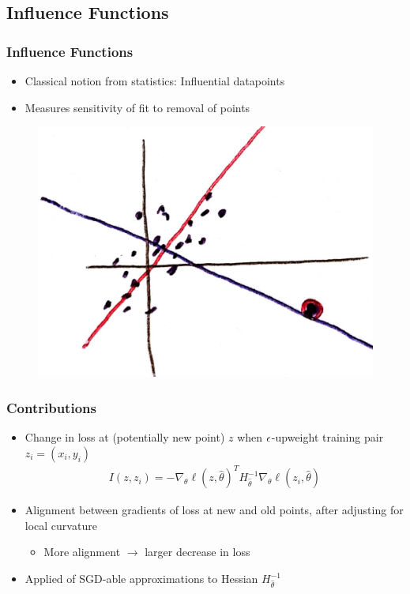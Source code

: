 \documentclass[10pt,mathserif]{beamer}
\begin{document}
\subsection{Influence Functions}

\begin{frame}
  \frametitle{Influence Functions}
  \begin{itemize}
  \item Classical notion from statistics: Influential datapoints
  \item Measures sensitivity of fit to removal of points
  \end{itemize} 
  \begin{figure}[ht]
    \centering
    \includegraphics[width=0.7\paperwidth]{figure/classical_influence}
    \caption{\label{fig:classical_influence} }
\end{figure}
\end{frame}

\begin{frame}
  \frametitle{Contributions}
  \begin{itemize}
  \item Change in loss at (potentially new point) $z$ when $\epsilon$-upweight
    training pair $z_i = \left(x_i, y_i\right)$
    \begin{align*}
    I\left(z, z_i\right) = -\nabla_{\theta} \ell\left(z, \hat{\theta}\right)^{T} H^{-1}_{\hat{\theta}} \nabla_{\theta} \ell\left(z_i, \hat{\theta}\right)
    \end{align*}
  \item Alignment between gradients of loss at new and old points, after
    adjusting for local curvature 
    \begin{itemize}
    \item More alignment $\rightarrow$ larger decrease in loss
    \end{itemize}
  \item Applied of SGD-able approximations to Hessian $H^{-1}_{\hat{\theta}}$
  \end{itemize}
\end{frame}
\end{document}
